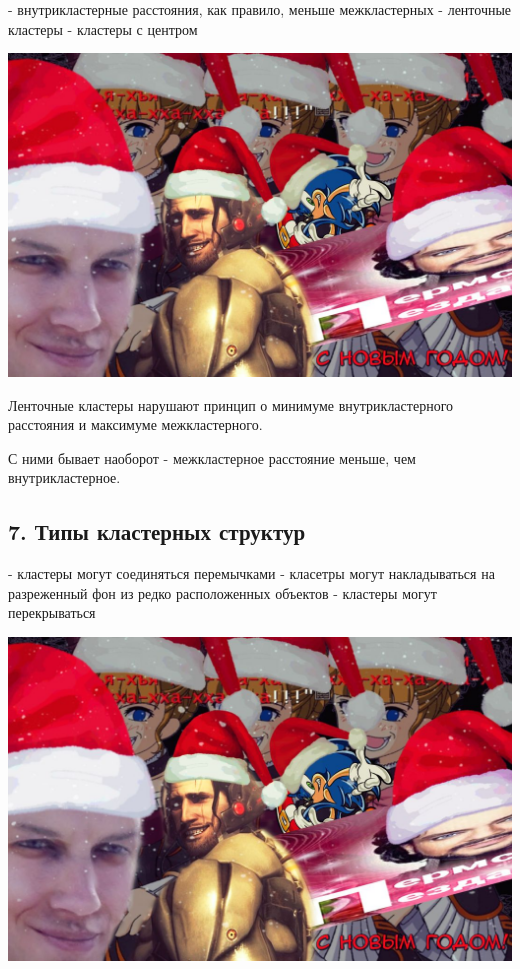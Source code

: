 - внутрикластерные расстояния, как правило, меньше межкластерных
- ленточные кластеры
- кластеры с центром

\includegraphics[scale=0.3]{figures/samplefigure.jpg}

Ленточные кластеры нарушают принцип о минимуме внутрикластерного
расстояния и максимуме межкластерного.

С ними бывает наоборот - межкластерное расстояние меньше, чем
внутрикластерное.

\subsection{7. Типы кластерных структур}

- кластеры могут соединяться перемычками
- класетры могут накладываться на разреженный фон из редко расположенных
объектов
- кластеры могут перекрываться

\includegraphics[scale=0.3]{figures/samplefigure.jpg}

